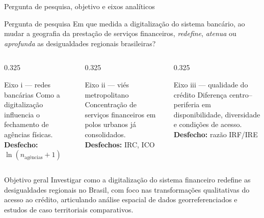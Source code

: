 \documentclass[aspectratio=169,10pt]{beamer}
\newcommand{\az}[1]{\textcolor{cedazul}{\textbf{#1}}}
\begin{document}
\begin{frame}{Pergunta de pesquisa, objetivo e eixos analíticos}
  \begin{alertblock}{Pergunta de pesquisa}
    Em que medida a digitalização do sistema bancário, ao mudar a geografia da
    prestação de serviços financeiros, \emph{redefine}, \emph{atenua} ou
    \emph{aprofunda} as desigualdades regionais brasileiras?
  \end{alertblock}

  \vspace{0.3em}
  \begin{columns}[T]
    \begin{column}{0.325\textwidth}
      \begin{block}{Eixo i --- redes bancárias}
        \small Como a digitalização influencia o fechamento de agências físicas.
        \vspace{0.4em}\\ \az{Desfecho:} $\ln(n_{\text{agências}}+1)$
      \end{block}
    \end{column}
    \begin{column}{0.325\textwidth}
      \begin{block}{Eixo ii --- viés metropolitano}
        \small Concentração de serviços financeiros em polos urbanos já consolidados.
        \vspace{0.4em}\\ \az{Desfechos:} IRC, ICO
      \end{block}
    \end{column}
    \begin{column}{0.325\textwidth}
      \begin{block}{Eixo iii --- qualidade do crédito}
        \small Diferença centro--periferia em disponibilidade, diversidade e
        condições de acesso.
        \vspace{0.4em}\\ \az{Desfecho:} razão IRF/IRE
      \end{block}
    \end{column}
  \end{columns}

  \vspace{0.4em}
  \begin{exampleblock}{Objetivo geral}
    \small Investigar como a digitalização do sistema financeiro redefine as
    desigualdades regionais no Brasil, com foco nas transformações qualitativas do
    acesso ao crédito, articulando análise espacial de dados georreferenciados e
    estudos de caso territoriais comparativos.
  \end{exampleblock}
\end{frame}
\end{document}
